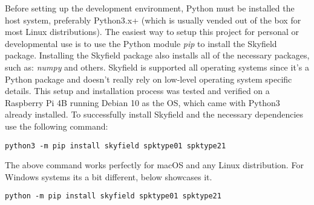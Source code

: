 \documentclass[../main.tex]{subfiles}
\begin{document}
Before setting up the development environment, Python must be installed the host system, preferably Python3.x+ (which is usually vended out of the box for most Linux distributions). The easiest way to setup this project for personal or developmental use is to use the Python module \textit{pip} to install the Skyfield\cite{skyfield-main} package. Installing the Skyfield package also installs all of the necessary packages, such as: \textit{numpy} and others. Skyfield is supported all operating systems since it's a Python package and doesn't really rely on low-level operating system specific details. This setup and installation process was tested and verified on a Raspberry Pi 4B running Debian 10 as the OS, which came with Python3 already installed. To successfully install Skyfield and the necessary dependencies use the following command:

\begin{lstlisting}
python3 -m pip install skyfield spktype01 spktype21
\end{lstlisting}

The above command works perfectly for macOS and any Linux distribution. For Windows systems its a bit different, below showcases it. 

\begin{lstlisting}
python -m pip install skyfield spktype01 spktype21
\end{lstlisting}
\end{document}
